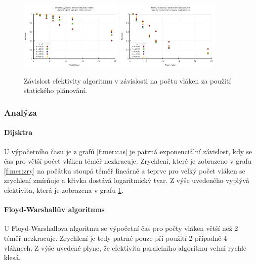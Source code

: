 \begin{figure}
    \centering
    \includegraphics[width=0.45\textwidth]{../grafy/02_openMP/02-03-Dijsktra_efektivita}
    \includegraphics[width=0.45\textwidth]{../grafy/02_openMP/02-03-Floyd_efektivita}
    \caption{Závislost efektivity algoritmu v závislosti na počtu vláken za použití statického plánování.}
    \label{f:mer:efe}
\end{figure}

\subsubsection{Analýza}
\paragraph{Dijsktra}
U výpočetního času je z grafů \ref{f:mer:cas} je patrná exponenciální závislost, kdy se čas pro větší počet vláken téměř nezkracuje. Zrychlení, které je zobrazeno v grafu \ref{f:mer:zry} na počátku stoupá téměř lineárně a teprve pro velký počet vláken se zrychlení zmírňuje a křivka dostává logaritmický tvar. Z výše uvedeného vyplývá efektivita, která je zobrazena v grafu \ref{f:mer:efe}.

\paragraph{Floyd-Warshallův algoritmus}
U Floyd-Warshallova algoritmu se výpočetní čas pro počty vláken větší než 2 téměř nezkracuje. Zrychlení je tedy patrné pouze při použití 2 případně 4 vláknech. Z výše uvedené plyne, že efektivita paralelního algoritmu velmi rychle klesá.

